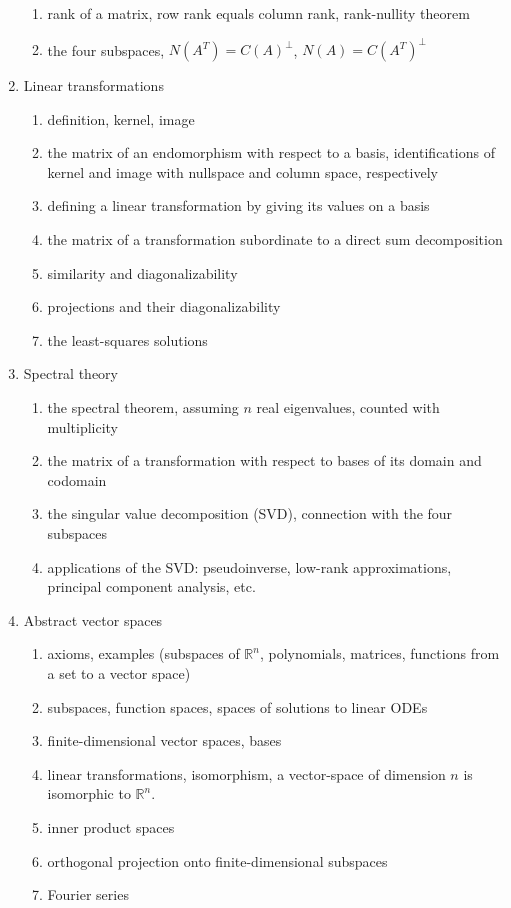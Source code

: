 \documentclass{amsart}
\newcommand{\RR}{\mathbb{R}}
\begin{document}
\begin{enumerate}
\begin{enumerate}
   \item rank of a matrix, row rank equals column rank, rank-nullity theorem
   \item the four subspaces, $N(A^T)=C(A)^\perp$, $N(A)=C(A^T)^\perp$
 \end{enumerate}
 \item Linear transformations
 \begin{enumerate}
  \item definition, kernel, image
  \item the matrix of an endomorphism with respect to a basis, identifications of kernel and image with nullspace and column space, respectively
  \item defining a linear transformation by giving its values on a basis
  \item the matrix of a transformation subordinate to a direct sum decomposition
  \item similarity and diagonalizability
  \item projections and their diagonalizability
  \item the least-squares solutions
 \end{enumerate}
 \item Spectral theory
 \begin{enumerate}
  \item the spectral theorem, assuming $n$ real eigenvalues, counted with multiplicity
  \item the matrix of a transformation with respect to bases of its domain and codomain
  \item the singular value decomposition (SVD), connection with the four subspaces
  \item applications of the SVD: pseudoinverse, low-rank approximations, principal component analysis, etc.
 \end{enumerate}
 \item Abstract vector spaces
 \begin{enumerate}
  \item axioms, examples (subspaces of $\RR^n$, polynomials, matrices, functions from a set to a vector space)
  \item subspaces, function spaces, spaces of solutions to linear ODEs
  \item finite-dimensional vector spaces, bases
  \item linear transformations, isomorphism, a vector-space of dimension $n$ is isomorphic to $\RR^n$.
  \item inner product spaces
  \item orthogonal projection onto finite-dimensional subspaces
  \item Fourier series
 \end{enumerate}
\end{enumerate}
\end{document}
